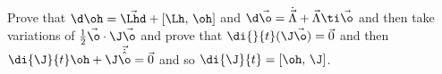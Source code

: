 \begin{exercise}
  Prove that $\d \oh = \vec\Lhd + [\Lh,\, \oh]$ and $\d\vec\o = \dot{\vec{\Lambda}} + \vec\Lambda \ti \vec\o$ and then take variations of $\frac{1}{2}\vec\o \cdot \J\vec\o$ and prove that $\di{}{t} (\J\vec\o) = \vec 0$
  and then
 $\di{\J}{t} \oh + \J\vec{\dot{\hat{\o}}} = \vec 0$ and so $\di{\J}{t} = [\oh,\,\J]$.
\end{exercise}
